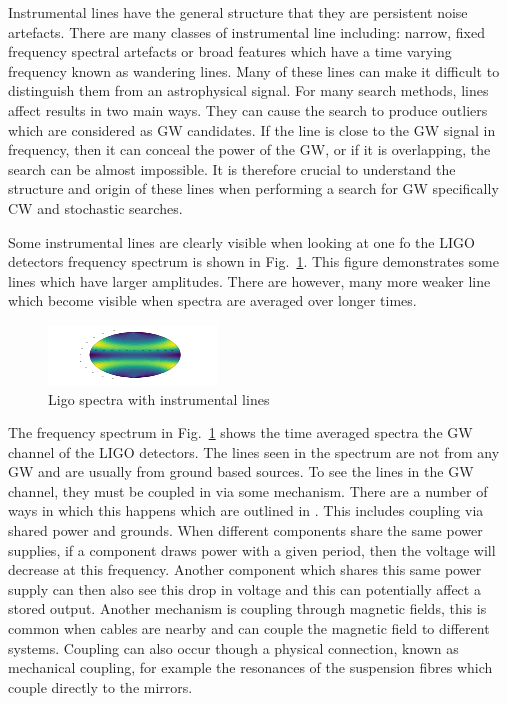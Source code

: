 Instrumental lines have the general structure that they are persistent noise artefacts.
There are many classes of instrumental line including: narrow, fixed frequency spectral artefacts or broad features which have a time varying frequency known as wandering lines.
Many of these lines can make it difficult to distinguish them from an astrophysical signal.
For many search methods, lines affect results in two main ways. 
They can cause the search to produce outliers which are considered as \ac{GW} candidates.
If the line is close to the \ac{GW} signal in frequency, then it can conceal the power of the \ac{GW}, or if it is overlapping, the search can be almost impossible.
It is therefore crucial to understand the structure and origin of these lines when performing a search for \ac{GW} specifically \ac{CW} and stochastic searches.

Some instrumental lines are clearly visible when looking at one fo the \ac{LIGO} detectors frequency spectrum is shown in Fig.~\ref{detchar:line:psd}. This figure demonstrates some lines which have larger amplitudes. There are however, many more weaker line which become visible when spectra are averaged over longer times.
\begin{figure}
    \centering
    \includegraphics[width=\textwidth]{testimg.png}
    \caption{Ligo spectra with instrumental lines}
    \label{detchar:line:psd}
\end{figure}
The frequency spectrum in Fig.~\ref{detchar:line:psd} shows the time averaged spectra the \ac{GW} channel of the \ac{LIGO} detectors. 
The lines seen in the spectrum are not from any \ac{GW} and are usually from ground based sources.
To see the lines in the \ac{GW} channel, they must be coupled in via some mechanism. 
There are a number of ways in which this happens which are outlined in \citep{covas2018IdentificationMitigation}.
This includes coupling via shared power and grounds. 
When different components share the same power supplies, if a component draws power with a given period, then the voltage will decrease at this frequency. 
Another component which shares this same power supply can then also see this drop in voltage and this can potentially affect a stored output. 
Another mechanism is coupling through magnetic fields, this is common when cables are nearby and can couple the magnetic field to different systems.
Coupling can also occur though a physical connection, known as mechanical coupling, for example the resonances of the suspension fibres which couple directly to the mirrors.

